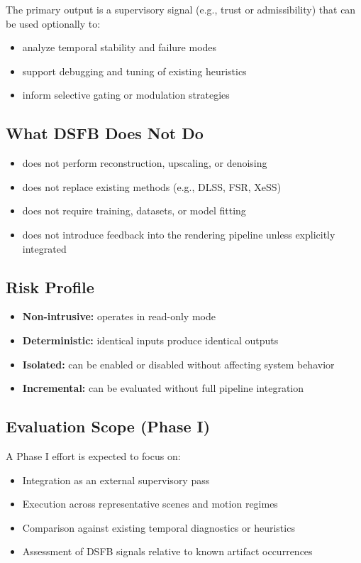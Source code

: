 \documentclass[11pt,letterpaper]{article}
\theoremstyle{gcresult}
\theoremstyle{definition}
\begin{document}
The primary output is a supervisory signal (e.g., trust or admissibility) that can be used optionally to:
\begin{itemize}
    \item analyze temporal stability and failure modes
    \item support debugging and tuning of existing heuristics
    \item inform selective gating or modulation strategies
\end{itemize}

\subsection{What DSFB Does Not Do}
\begin{itemize}
    \item does not perform reconstruction, upscaling, or denoising
    \item does not replace existing methods (e.g., DLSS, FSR, XeSS)
    \item does not require training, datasets, or model fitting
    \item does not introduce feedback into the rendering pipeline unless explicitly integrated
\end{itemize}

\subsection{Risk Profile}
\begin{itemize}
    \item \textbf{Non-intrusive:} operates in read-only mode
    \item \textbf{Deterministic:} identical inputs produce identical outputs
    \item \textbf{Isolated:} can be enabled or disabled without affecting system behavior
    \item \textbf{Incremental:} can be evaluated without full pipeline integration
\end{itemize}

\subsection{Evaluation Scope (Phase I)}
A Phase I effort is expected to focus on:
\begin{itemize}
    \item Integration as an external supervisory pass
    \item Execution across representative scenes and motion regimes
    \item Comparison against existing temporal diagnostics or heuristics
    \item Assessment of DSFB signals relative to known artifact occurrences
\end{itemize}
\end{document}
